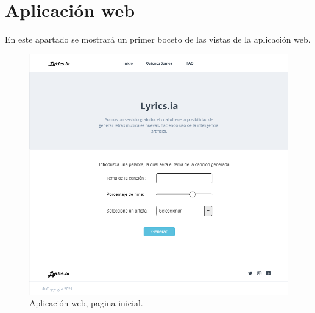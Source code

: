 \documentclass[12pt, a4paper, titlepage]{report}
\begin{document}
	\newpage

\section{Aplicación web}
En este apartado se mostrará un primer boceto de las vistas de la aplicación web.	        
\begin{figure}[H] \caption{Aplicación web, pagina inicial.}
	\includegraphics[width=12cm]{./imagenes/Analisis/MockFront.png}
	\centering 
\end{figure}
\end{document}
